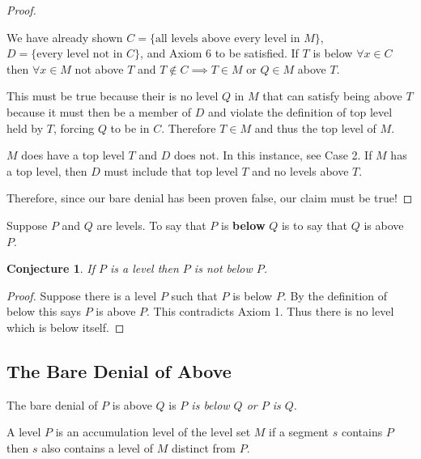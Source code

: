 \documentclass[12pt]{article}
\newtheorem{conjecture}{Conjecture}
\begin{document}
\begin{proof}
\begin{description}
        We have already shown $C = \{ \text{all levels above every level in $M$} \}$, $D = \{ \text{every level not in $C$} \}$, and Axiom 6 to be satisfied. If $T$ is below $\forall x \in C$ then $\forall x \in M$ not above $T$ and $T \not\in C \implies T \in M$ or $Q \in M$ above $T$.

        This must be true because their is no level $Q$ in $M$ that can satisfy being above $T$ because it must then be a member of $D$ and violate the definition of top level held by $T$, forcing $Q$ to be in $C$. Therefore $T \in M$ and thus the top level of $M$.



        \item[Case \#3] $M$ does have a top level $T$ and $D$ does not. In this instance, see Case 2. If $M$ has a top level, then $D$ must include that top level $T$ and no levels above $T$.
    \end{description}

    Therefore, since our bare denial has been proven false, our claim must be true!
\end{proof}

\problem
Suppose $P$ and $Q$ are levels. To say that $P$ is \textbf{below} $Q$ is to say that $Q$ is above $P$.

\begin{conjecture}
    If $P$ is a level then $P$ is not below $P$.
\end{conjecture}

\begin{proof}
    Suppose there is a level $P$ such that $P$ is below $P$. By the definition of below this says $P$ is above $P$. This contradicts Axiom 1. Thus there is no level which is below itself.
\end{proof}

\subsection{The Bare Denial of Above}
The bare denial of $P$ is above $Q$ is \textit{$P$ is below $Q$ or $P$ is $Q$}.


\problem
\solutionAlt
A level $P$ is an accumulation level of the level set $M$ if a segment $s$ contains $P$ then $s$ also contains a level of $M$ distinct from $P$.
\end{document}

